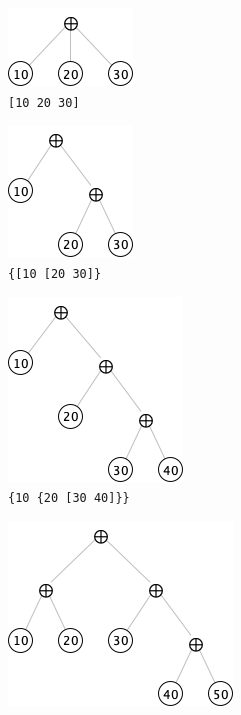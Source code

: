 \documentclass[11pt]{article}
\begin{document}
\begin{figure}[h] 
\centering
	\begin{subfigure}[b]{.3\textwidth}
		\centering
		\includegraphics[scale=.5]{diags/tree1.png}
		\caption{{\texttt{[10 20 30]}}}\label{fig:a}
	\end{subfigure}	
  	\begin{subfigure}[b]{.3\textwidth}
  		\centering
    		\includegraphics[scale=.5]{diags/tree2.png}
    		\caption{\texttt{\{[10 [20 30]\}}}\label{fig:b}
    \end{subfigure}
    \begin{subfigure}[b]{.3\textwidth}
    		\centering
    		\includegraphics[scale=.5]{diags/tree3.png}
    		\caption{\texttt{\{10 \{20 [30 40]\}\}}}\label{fig:c}
    \end{subfigure}
    \begin{subfigure}[b]{.45\textwidth}
    		\centering
    		\includegraphics[scale=.5]{diags/tree4.png}

\end{subfigure}
\end{figure}
\end{document}
